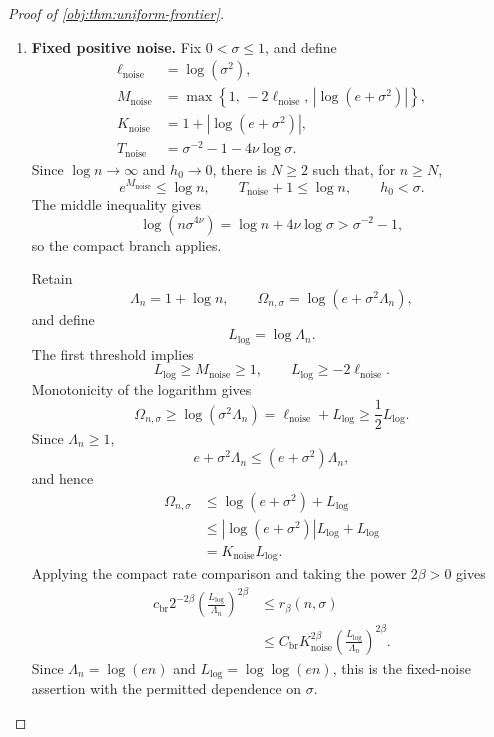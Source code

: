 \begin{proof}[Proof of \cref{obj:thm:uniform-frontier}]
\begin{enumerate}
For \(a\ge1/\nu\), monotonicity in the exponent for \(n>1\) gives
\[
0<n^{-a}\le n^{-1/\nu}=h_0\le1.
\]
Hence the exact direct branch applies for every \(n\ge2\), with
\[
h_\star(n,n^{-a})=h_0,
\qquad
r_\beta(n,n^{-a})=n^{-\beta/\nu}.
\]

\item \textbf{Fixed positive noise.}
Fix \(0<\sigma\le1\), and define
\[
\begin{aligned}
\ell_{\mathrm{noise}}&=\log(\sigma^2),\\
M_{\mathrm{noise}}&=\max\left\{
1,\,-2\ell_{\mathrm{noise}},\,|\log(e+\sigma^2)|
\right\},\\
K_{\mathrm{noise}}&=1+|\log(e+\sigma^2)|,\\
T_{\mathrm{noise}}&=\sigma^{-2}-1-4\nu\log\sigma.
\end{aligned}
\]
Since \(\log n\to\infty\) and \(h_0\to0\), there is \(N\ge2\) such that, for
\(n\ge N\),
\[
e^{M_{\mathrm{noise}}}\le\log n,\qquad
T_{\mathrm{noise}}+1\le\log n,\qquad
h_0<\sigma.
\]
The middle inequality gives
\[
\log(n\sigma^{4\nu})
=\log n+4\nu\log\sigma
>\sigma^{-2}-1,
\]
so the compact branch applies.

Retain
\[
\Lambda_n=1+\log n,\qquad
\Omega_{n,\sigma}=\log(e+\sigma^2\Lambda_n),
\]
and define
\[
L_{\mathrm{log}}=\log\Lambda_n.
\]
The first threshold implies
\[
L_{\mathrm{log}}\ge M_{\mathrm{noise}}\ge1,
\qquad
L_{\mathrm{log}}\ge-2\ell_{\mathrm{noise}}.
\]
Monotonicity of the logarithm gives
\[
\Omega_{n,\sigma}
\ge\log(\sigma^2\Lambda_n)
=\ell_{\mathrm{noise}}+L_{\mathrm{log}}
\ge\frac12L_{\mathrm{log}}.
\]
Since \(\Lambda_n\ge1\),
\[
e+\sigma^2\Lambda_n\le(e+\sigma^2)\Lambda_n,
\]
and hence
\[
\begin{aligned}
\Omega_{n,\sigma}
&\le\log(e+\sigma^2)+L_{\mathrm{log}}\\
&\le|\log(e+\sigma^2)|L_{\mathrm{log}}+L_{\mathrm{log}}\\
&=K_{\mathrm{noise}}L_{\mathrm{log}}.
\end{aligned}
\]
Applying the compact rate comparison and taking the power \(2\beta>0\) gives
\[
\begin{aligned}
c_{\mathrm{br}}2^{-2\beta}
\left(\frac{L_{\mathrm{log}}}{\Lambda_n}\right)^{2\beta}
&\le r_\beta(n,\sigma)\\
&\le
C_{\mathrm{br}}K_{\mathrm{noise}}^{2\beta}
\left(\frac{L_{\mathrm{log}}}{\Lambda_n}\right)^{2\beta}.
\end{aligned}
\]
Since \(\Lambda_n=\log(en)\) and \(L_{\mathrm{log}}=\log\log(en)\), this is the
fixed-noise assertion with the permitted dependence on \(\sigma\).


\end{enumerate}
\end{proof}
